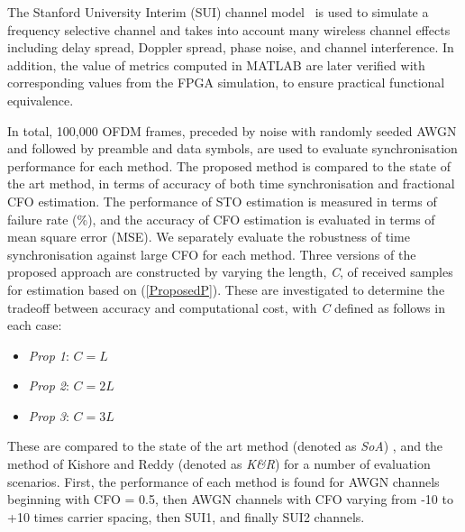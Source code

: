 The Stanford University Interim (SUI) channel model~\cite{V.ErcegJuly2003} is used to simulate a frequency selective channel and takes into account  many wireless channel effects including delay spread, Doppler spread, phase noise, and channel interference.
In addition, the value of metrics computed in MATLAB are later verified with corresponding values from the FPGA simulation, to ensure practical functional equivalence.

In total, 100,000 OFDM frames, preceded by noise with randomly seeded AWGN and followed by preamble and data symbols, are used to evaluate synchronisation performance for each method.
The proposed method is compared to the state of the art method, in terms of accuracy of both time synchronisation and fractional CFO estimation.
The performance of STO estimation is measured in terms of failure rate (\%), and the accuracy of CFO estimation is evaluated in terms of mean square error (MSE).
We separately evaluate the robustness of time synchronisation against large CFO for each method.
Three versions of the proposed approach are constructed by varying the length, \emph{C}, of received samples for estimation based on (\ref{ProposedP}). These are investigated to determine the tradeoff between accuracy and computational cost, with \emph{C} defined as follows in each case:
\begin{itemize}
\item \textit{Prop 1}: $C=L$
\item \textit{Prop 2}: $C=2L$
\item \textit{Prop 3}: $C=3L$
\end{itemize}
These are compared to the state of the art method (denoted as \textit{SoA}) \cite{Liu2009,Recio2010}, and the method of Kishore and Reddy \cite{Kishore2006} (denoted as \textit{K\&R}) for a number of evaluation scenarios.
First, the performance of each method is found for AWGN channels beginning with CFO = 0.5, then AWGN channels with CFO varying from -10 to +10 times carrier spacing, then SUI1, and finally SUI2 channels.

